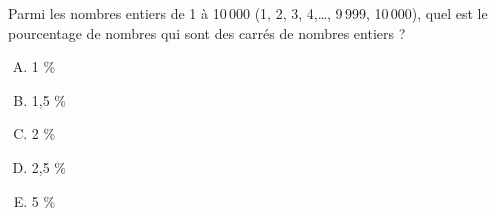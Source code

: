 Parmi les nombres entiers de 1 à 10\,000 (1, 2, 3, 4,\ldots, 9\,999,
10\,000), quel est le pourcentage de nombres qui sont des carrés de
nombres entiers ?
\begin{multicols}{5}
  \begin{enumerate}[A)]
  \item 1 \%
  \item 1,5 \%
  \item 2 \%
  \item 2,5 \%
  \item 5 \%
  \end{enumerate}
\end{multicols}